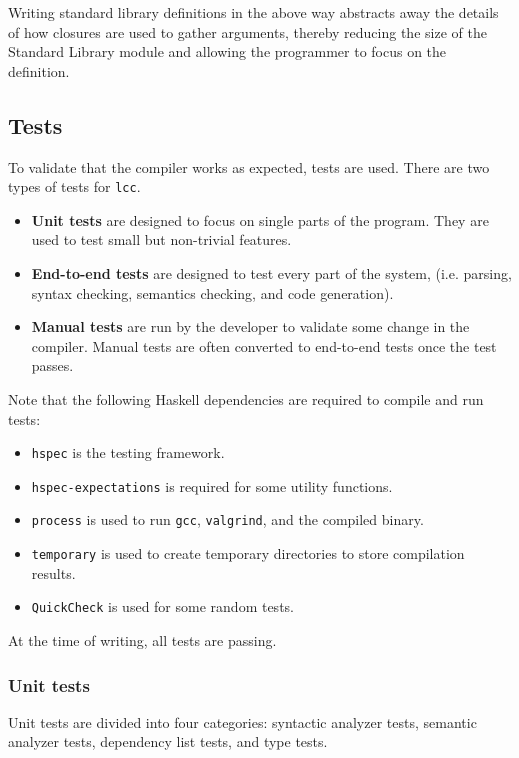 \documentclass[12pt]{article}
\begin{document}
Writing standard library definitions in the above way abstracts away the details
of how closures are used to gather arguments, thereby reducing the size of the
Standard Library module and allowing the programmer to focus on the definition.

\subsection{Tests}

To validate that the compiler works as expected, tests are used. There
are two types of tests for \verb$lcc$.
\begin{itemize}
    \item \textbf{Unit tests} are designed to focus on single parts of the program.
        They are used to test small but non-trivial features.
    \item \textbf{End-to-end tests} are designed to test every part of the
        system, (i.e. parsing, syntax checking, semantics checking, and code
        generation). 
    \item \textbf{Manual tests} are run by the developer to validate some change
        in the compiler. Manual tests are often converted to end-to-end tests
        once the test passes.
\end{itemize}
Note that the following Haskell dependencies are required to compile and run
tests:
\begin{itemize}
    \item \verb$hspec$ is the testing framework.
    \item \verb$hspec-expectations$ is required for some utility functions.
    \item \verb$process$ is used to run \verb$gcc$, \verb$valgrind$, and the
        compiled binary.
    \item \verb$temporary$ is used to create temporary directories to store
        compilation results.
    \item \verb$QuickCheck$ is used for some random tests.
\end{itemize}
At the time of writing, all tests are passing.

\subsubsection{Unit tests}

Unit tests are divided into four categories: syntactic analyzer tests, semantic
analyzer tests, dependency list tests, and type tests.
\end{document}
